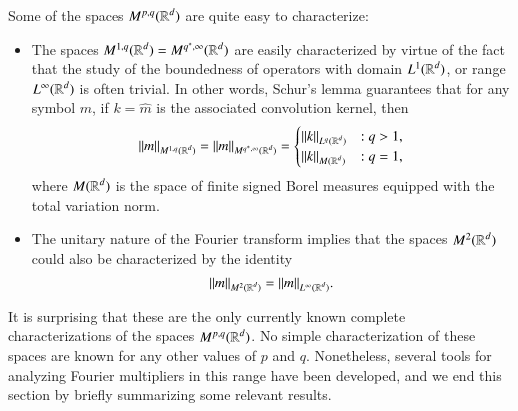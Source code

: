Some of the spaces $M^{p,q}(\operatorname{\mathbb{R}}^d)$ are quite easy to characterize:
%
\begin{itemize}
    \item The spaces $M^{1,q}(\operatorname{\mathbb{R}}^d) = M^{q^*,\infty}(\operatorname{\mathbb{R}}^d)$ are easily characterized by virtue of the fact that the study of the boundedness of operators with domain $L^1(\operatorname{\mathbb{R}}^d)$, or range $L^\infty(\operatorname{\mathbb{R}}^d)$ is often trivial. In other words, Schur's lemma guarantees that for any symbol $m$, if $k = \widehat{m}$ is the associated convolution kernel, then
    \[ \| m \|_{M^{1,q}(\operatorname{\mathbb{R}}^d)} = \| m \|_{M^{q^*,\infty}(\operatorname{\mathbb{R}}^d)} = \begin{cases} \| k \|_{L^q(\operatorname{\mathbb{R}}^d)} &: q > 1, \\ \| k \|_{M(\operatorname{\mathbb{R}}^d)} &: q = 1, \end{cases} \]
    where $M(\operatorname{\mathbb{R}}^d)$ is the space of finite signed Borel measures equipped with the total variation norm.

    \item The unitary nature of the Fourier transform implies that the spaces $M^2(\operatorname{\mathbb{R}}^d)$ could also be characterized by the identity
    \[ \| m \|_{M^2(\operatorname{\mathbb{R}}^d)} = \| m \|_{L^\infty(\operatorname{\mathbb{R}}^d)}. \]
\end{itemize}
%
It is surprising that these are the only currently known complete characterizations of the spaces $M^{p,q}(\operatorname{\mathbb{R}}^d)$. No simple characterization of these spaces are known for any other values of $p$ and $q$. Nonetheless, several tools for analyzing Fourier multipliers in this range have been developed, and we end this section by briefly summarizing some relevant results.

